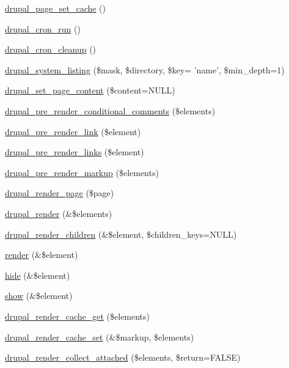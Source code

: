 \begin{DoxyCompactItemize}
\item 
\hyperlink{common_8inc_ac46363381db03a8d6a2663d031d8ce07}{drupal\_\-page\_\-set\_\-cache} ()
\item 
\hyperlink{common_8inc_a1d4a4362b30215023a7120b627a9fd4f}{drupal\_\-cron\_\-run} ()
\item 
\hyperlink{common_8inc_a9067aaeb503fb9f994d98728130390a2}{drupal\_\-cron\_\-cleanup} ()
\item 
\hyperlink{common_8inc_a60d1237b23d4e84a59656003596add4b}{drupal\_\-system\_\-listing} (\$mask, \$directory, \$key= 'name', \$min\_\-depth=1)
\item 
\hyperlink{common_8inc_a87c72c30529e99da7d4b25b6c1e00b1d}{drupal\_\-set\_\-page\_\-content} (\$content=NULL)
\item 
\hyperlink{common_8inc_a796bc999f4924685425e38cfb0a916ef}{drupal\_\-pre\_\-render\_\-conditional\_\-comments} (\$elements)
\item 
\hyperlink{common_8inc_a58664756a8b7d1e1d3765a54057c6d8b}{drupal\_\-pre\_\-render\_\-link} (\$element)
\item 
\hyperlink{common_8inc_a678780979d6d69c92710d392004411ff}{drupal\_\-pre\_\-render\_\-links} (\$element)
\item 
\hyperlink{common_8inc_a3367ec9635e712d363e2363d16558128}{drupal\_\-pre\_\-render\_\-markup} (\$elements)
\item 
\hyperlink{common_8inc_ad85d021b660f070849ed7c215d9758fe}{drupal\_\-render\_\-page} (\$page)
\item 
\hyperlink{common_8inc_a05798b44e8d6c496d4bee5cc32fa7851}{drupal\_\-render} (\&\$elements)
\item 
\hyperlink{common_8inc_aa0cac24bf2aa19237fd012fea704b8ac}{drupal\_\-render\_\-children} (\&\$element, \$children\_\-keys=NULL)
\item 
\hyperlink{common_8inc_a5f4b2009c1caf78549203cec9b324305}{render} (\&\$element)
\item 
\hyperlink{common_8inc_aa57f04b6e1f5cdc3ed30abf98fd0fd3f}{hide} (\&\$element)
\item 
\hyperlink{common_8inc_a5118f0601a3243a2d651369892b6cd47}{show} (\&\$element)
\item 
\hyperlink{common_8inc_a8726783745547f4686cea624be0b0562}{drupal\_\-render\_\-cache\_\-get} (\$elements)
\item 
\hyperlink{common_8inc_aee3169994180319d0fe2b1738825c54c}{drupal\_\-render\_\-cache\_\-set} (\&\$markup, \$elements)
\item 
\hyperlink{common_8inc_a3a65448a9382c58f1767b8b01f27dae6}{drupal\_\-render\_\-collect\_\-attached} (\$elements, \$return=FALSE)

\end{DoxyCompactItemize}
